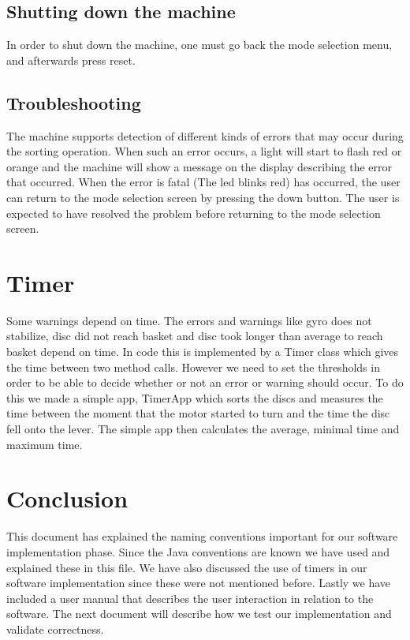\documentclass[a4paper,oneside,11pt]{article}
\begin{document}
\subsection{Shutting down the machine}
In order to shut down the machine, one must go back the mode selection menu, and afterwards press reset.

\subsection{Troubleshooting}
The machine supports detection of different kinds of errors that may occur during the sorting operation. When such an error occurs, a light will start to flash red or orange and the machine will show a message on the display describing the error that occurred. When the error is fatal (The led blinks red) has occurred, the user can return to the mode selection screen by pressing the down button. The user is expected to have resolved the problem before returning to the mode selection screen. 


\section{Timer}
Some warnings depend on time. The errors and warnings like gyro does not stabilize, disc did not reach basket and disc took longer than average to reach basket depend on time. In code this is implemented by a Timer class which gives the time between two method calls. However we need to set the thresholds in order to be able to decide whether or not an error or warning should occur. To do this we made a simple app, TimerApp which sorts the discs and measures the time between the moment that the motor started to turn and the time the disc fell onto the lever. The simple app then calculates the average, minimal time and maximum time.

\section{Conclusion}
This document has explained the naming conventions important for our software implementation phase. Since the Java conventions are known we have used and explained these in this file. We have also discussed the use of timers in our software implementation since these were not mentioned before. Lastly we have included a user manual that describes the user interaction in relation to the software. The next document will describe how we test our implementation and validate correctness.
\end{document}
